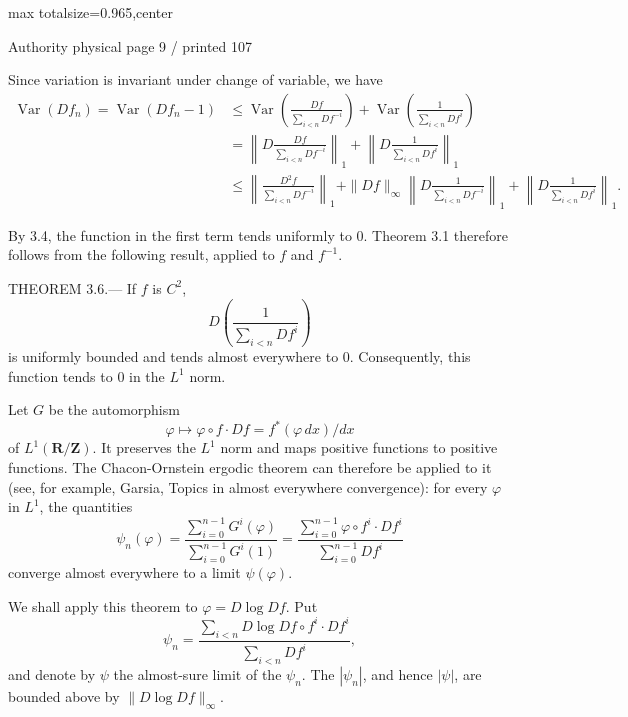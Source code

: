 \documentclass{article}
\begin{document}
\newpage
\noindent\begin{adjustbox}{max totalsize={\textwidth}{0.965\textheight},center}\begin{minipage}{\textwidth}
\noindent\hfill\scriptsize Authority physical page 9 / printed 107\par\normalsize
Since variation is invariant under change of variable, we have
\[
\begin{aligned}
\operatorname{Var}(Df_n)=\operatorname{Var}(Df_n-1)
&\leq\operatorname{Var}\left(\frac{Df}{\sum_{i<n}Df^{-i}}\right)
+\operatorname{Var}\left(\frac1{\sum_{i<n}Df^i}\right)\\
&=\left\|D\frac{Df}{\sum_{i<n}Df^{-i}}\right\|_1
+\left\|D\frac1{\sum_{i<n}Df^i}\right\|_1\\
&\leq\left\|\frac{D^2f}{\sum_{i<n}Df^{-i}}\right\|_1
+\|Df\|_\infty\left\|D\frac1{\sum_{i<n}Df^{-i}}\right\|_1
+\left\|D\frac1{\sum_{i<n}Df^i}\right\|_1.
\end{aligned}
\]

By 3.4, the function in the first term tends uniformly to \(0\). Theorem 3.1 therefore follows from the following result, applied to \(f\) and \(f^{-1}\).

THEOREM 3.6.— If \(f\) is \(C^2\),
\[
D\left(\frac1{\sum_{i<n}Df^i}\right)
\]
is uniformly bounded and tends almost everywhere to \(0\). Consequently, this function tends to \(0\) in the \(L^1\) norm.

Let \(G\) be the automorphism
\[
\varphi\longmapsto\varphi\circ f\cdot Df=f^*(\varphi\,dx)/dx
\]
of \(L^1(\mathbf R/\mathbf Z)\). It preserves the \(L^1\) norm and maps positive functions to positive functions. The Chacon-Ornstein ergodic theorem can therefore be applied to it (see, for example, Garsia, Topics in almost everywhere convergence): for every \(\varphi\) in \(L^1\), the quantities
\[
\psi_n(\varphi)
=\frac{\sum_{i=0}^{n-1}G^i(\varphi)}{\sum_{i=0}^{n-1}G^i(1)}
=\frac{\sum_{i=0}^{n-1}\varphi\circ f^i\cdot Df^i}{\sum_{i=0}^{n-1}Df^i}
\]
converge almost everywhere to a limit \(\psi(\varphi)\).

We shall apply this theorem to \(\varphi=D\log Df\). Put
\[
\psi_n=\frac{\sum_{i<n}D\log Df\circ f^i\cdot Df^i}{\sum_{i<n}Df^i},
\]
and denote by \(\psi\) the almost-sure limit of the \(\psi_n\). The \(|\psi_n|\), and hence \(|\psi|\), are bounded above by \(\|D\log Df\|_\infty\).
\end{minipage}\end{adjustbox}
\end{document}
